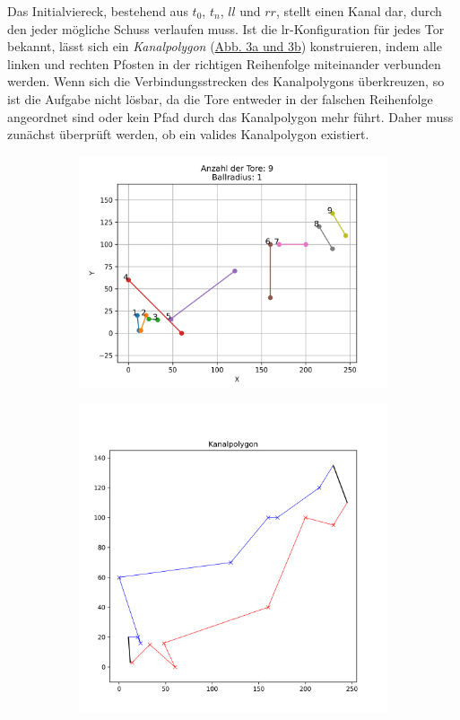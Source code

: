 Das Initialviereck, bestehend aus \(t_0\), \(t_n\), \(ll\) und \(rr\), stellt einen Kanal dar, durch den jeder mögliche Schuss verlaufen muss. Ist die lr-Konfiguration für jedes Tor bekannt, lässt sich ein \emph{Kanalpolygon} (\hyperref[fig:kanalpolygon]{Abb. 3a und 3b}) konstruieren, indem alle linken und rechten Pfosten in der richtigen Reihenfolge miteinander verbunden werden. Wenn sich die Verbindungsstrecken des Kanalpolygons überkreuzen, so ist die Aufgabe nicht lösbar, da die Tore entweder in der falschen Reihenfolge angeordnet sind oder kein Pfad durch das Kanalpolygon mehr führt. Daher muss zunächst überprüft werden, ob ein valides Kanalpolygon existiert.




\begin{figure}[t]
    \centering

    \vspace{-1cm} 
    \begin{subfigure}{\linewidth}
        \centering
        \includegraphics[width=0.8\linewidth]{images/krocket1.png}
        \caption{}
        \label{fig:tore}
    \end{subfigure}
    \vspace{-0.5cm}        

    \begin{subfigure}{\linewidth}
        \centering
        \includegraphics[width=0.8\linewidth]{images/testplot.png}
        \caption{}
        \label{fig:kanalpolygon}
    \end{subfigure}


\end{figure}
